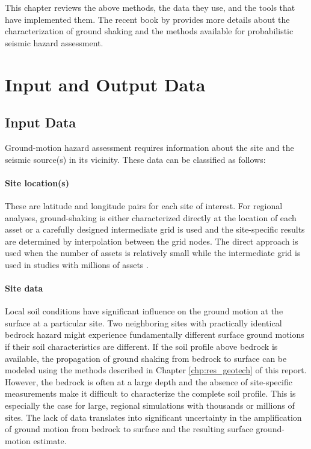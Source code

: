 This chapter reviews the above methods, the data they use, and the tools that have implemented them. The recent book by \cite{baker2021seismic} provides more details about the characterization of ground shaking and the methods available for probabilistic seismic hazard assessment. 

\section{Input and Output Data}
\label{sec:eq_shake_io}

\subsection{Input Data}

Ground-motion hazard assessment requires information about the site and the seismic source(s) in its vicinity. These data can be classified as follows:

\paragraph{Site location(s)} These are latitude and longitude pairs for each site of interest. For regional analyses, ground-shaking is either characterized directly at the location of each asset or a carefully designed intermediate grid is used and the site-specific results are determined by interpolation between the grid nodes. The direct approach is used when the number of assets is relatively small \citep[ e.g.,][]{padgett2010regional} while the intermediate grid is used in studies with millions of assets \citep[ e.g.,][]{deierlein2020cloud}.


\paragraph{Site data} Local soil conditions have significant influence on the ground motion at the surface at a particular site. Two neighboring sites with practically identical bedrock hazard might experience fundamentally different surface ground motions if their soil characteristics are different. If the soil profile above bedrock is available, the propagation of ground shaking from bedrock to surface can be modeled using the methods described in Chapter \ref{chp:res_geotech} of this report. However, the bedrock is often at a large depth and the absence of site-specific measurements make it difficult to characterize the complete soil profile. This is especially the case for large, regional simulations with thousands or millions of sites. The lack of data translates into significant uncertainty in the amplification of ground motion from bedrock to surface and the resulting surface ground-motion estimate. 

